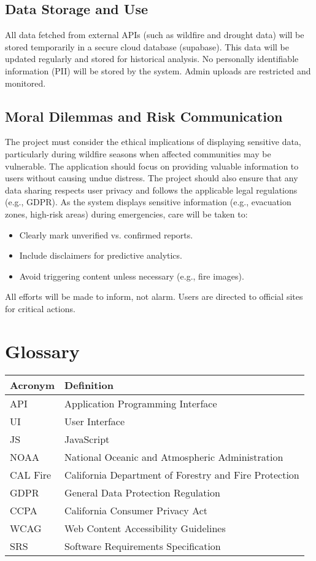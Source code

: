 \documentclass[12pt]{article}
\begin{document}
\subsection{Data Storage and Use}
All data fetched from external APIs (such as wildfire and drought data) will be stored temporarily in a secure cloud database (supabase). This data will be updated regularly and stored for historical analysis. No personally identifiable information (PII) will be stored by the system. Admin uploads are restricted and monitored.

\subsection{Moral Dilemmas and Risk Communication}
The project must consider the ethical implications of displaying sensitive data, particularly during wildfire seasons when affected communities may be vulnerable. The application should focus on providing valuable information to users without causing undue distress. The project should also ensure that any data sharing respects user privacy and follows the applicable legal regulations (e.g., GDPR). As the system displays sensitive information (e.g., evacuation zones, high-risk areas) during emergencies, care will be taken to:
\begin{itemize}
\item Clearly mark unverified vs. confirmed reports.
\item Include disclaimers for predictive analytics.
\item Avoid triggering content unless necessary (e.g., fire images).
\end{itemize}
All efforts will be made to inform, not alarm. Users are directed to official sites for critical actions.

\newpage
\section*{Glossary}
\begin{longtable}{|p{1.5in}|p{4in}|}
\hline
\textbf{Acronym} & \textbf{Definition} \\
\hline
API & Application Programming Interface \\
\hline
UI & User Interface \\
\hline
JS & JavaScript \\
\hline
NOAA & National Oceanic and Atmospheric Administration \\
\hline
CAL Fire & California Department of Forestry and Fire Protection \\
\hline
GDPR & General Data Protection Regulation \\
\hline
CCPA & California Consumer Privacy Act \\
\hline
WCAG & Web Content Accessibility Guidelines \\
\hline
SRS & Software Requirements Specification \\
\hline
\end{longtable}
\end{document}
